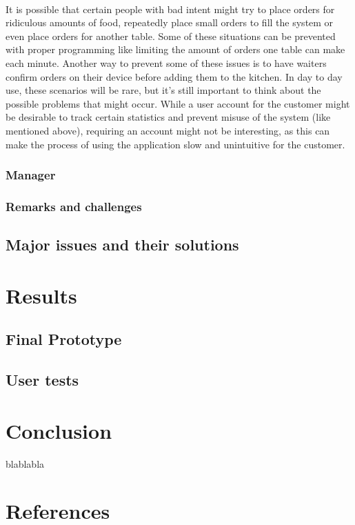 \documentclass[12pt]{article}
\begin{document}
\noindent \\It is possible that certain people with bad intent might try to place orders for ridiculous amounts of food, repeatedly place small orders to fill the system or even place orders for another table. Some of these situations can be prevented with proper programming like limiting the amount of orders one table can make each minute. Another way to prevent some of these issues is to have waiters confirm orders on their device before adding them to the kitchen. In day to day use, these scenarios will be rare, but it’s still important to think about the possible problems that might occur. 
While a user account for the customer might be desirable to track certain statistics and prevent misuse of the system (like mentioned above), requiring an account might not be interesting, as this can make the process of using the application slow and unintuitive for the customer.


\subsubsection{Manager}
\subsubsection{Remarks and challenges}
\subsection{Major issues and their solutions}

\section{Results}
\subsection{Final Prototype}
\subsection{User tests}

\section{Conclusion}



blablabla \cite{greenwade93} \cite{antonov2015spring} \cite{JavaTool10:online} \cite{farosProposal} \cite{SpringPopular1:online}


\newpage
\section{References}


\end{document}
